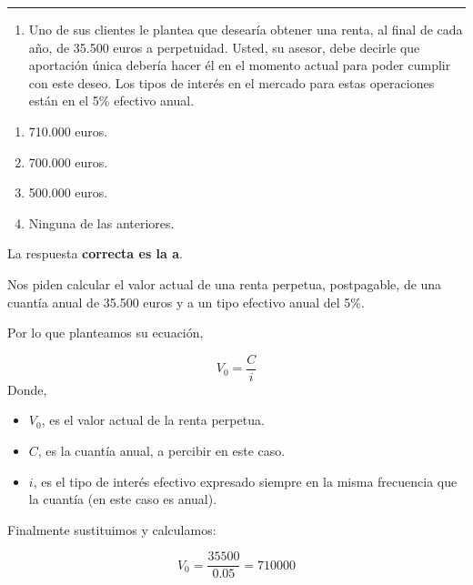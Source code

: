 \documentclass[
  letterpaper,
  DIV=11,
  numbers=noendperiod]{scrreprt}
\providecommand{\tightlist}{%
  \setlength{\itemsep}{0pt}\setlength{\parskip}{0pt}}\usepackage{longtable,booktabs,array}
\begin{document}
\begin{center}\rule{0.5\linewidth}{0.5pt}\end{center}

\begin{enumerate}
\def\labelenumi{\arabic{enumi}.}
\setcounter{enumi}{29}
\tightlist
\item
  Uno de sus clientes le plantea que desearía obtener una renta, al
  final de cada año, de 35.500 euros a perpetuidad. Usted, su asesor,
  debe decirle que aportación única debería hacer él en el momento
  actual para poder cumplir con este deseo. Los tipos de interés en el
  mercado para estas operaciones están en el 5\% efectivo anual.
\end{enumerate}

\begin{enumerate}
\def\labelenumi{\alph{enumi})}
\item
  710.000 euros.
\item
  700.000 euros.
\item
  500.000 euros.
\item
  Ninguna de las anteriores.
\end{enumerate}

\begin{tcolorbox}[enhanced jigsaw, left=2mm, opacityback=0, colback=white, breakable, arc=.35mm, bottomrule=.15mm, rightrule=.15mm, toprule=.15mm, leftrule=.75mm, colframe=quarto-callout-tip-color-frame]
\begin{minipage}[t]{5.5mm}
\textcolor{quarto-callout-tip-color}{\faLightbulb}
\end{minipage}%
\begin{minipage}[t]{\textwidth - 5.5mm}

La respuesta \textbf{correcta es la a}.

Nos piden calcular el valor actual de una renta perpetua, postpagable,
de una cuantía anual de 35.500 euros y a un tipo efectivo anual del 5\%.

Por lo que planteamos su ecuación,

\[V_0=\frac{C}{i}\] Donde,

\begin{itemize}
\item
  \(V_0\), es el valor actual de la renta perpetua.
\item
  \(C\), es la cuantía anual, a percibir en este caso.
\item
  \(i\), es el tipo de interés efectivo expresado siempre en la misma
  frecuencia que la cuantía (en este caso es anual).
\end{itemize}

Finalmente sustituimos y calculamos:

\[V_0=\frac{35500}{0.05}=710000\]

\end{minipage}%
\end{tcolorbox}
\end{document}
